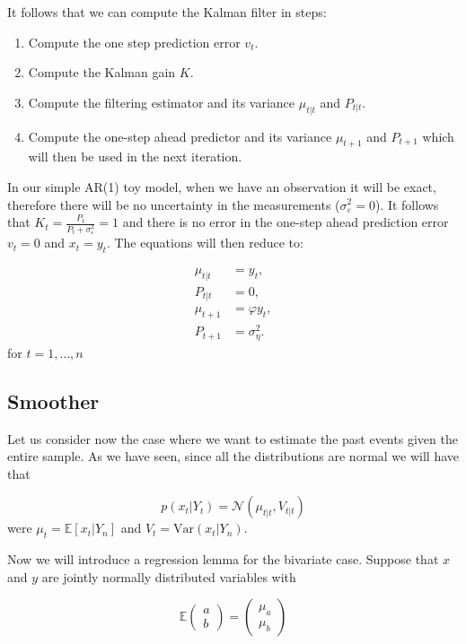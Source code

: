 \documentclass[11pt,a4paper]{article}
\newcommand{\E}{\mathbb{E}}
\newcommand{\var}{\mathrm{Var}}
\begin{document}
It follows that we can compute the Kalman filter in steps:

\begin{enumerate}
    \item Compute the one step prediction error $v_t$.
    \item Compute the Kalman gain $K$.
    \item Compute the filtering estimator and its variance $\mu_{t|t}$ and $P_{t|t}$.
    \item Compute the one-step ahead predictor and its variance $\mu_{t+1}$ and $P_{t+1}$ which will then be used in the next iteration.
\end{enumerate}

In our simple AR(1) toy model, when we have an observation it will be exact, therefore there will be no uncertainty in the measurements ($\sigma^2_\varepsilon = 0$). It follows that $K_t = \frac{P_t}{P_t + \sigma^2_\varepsilon} = 1$ and there is no error in the one-step ahead prediction error $v_t = 0$ and $x_t = y_t$. The equations will then reduce to:

\begin{align*}
    \mu_{t|t} &= y_t,\\
    P_{t|t} &= 0,\\
    \mu_{t+1} &= \varphi y_t,\\
    P_{t+1} &= \sigma^2_\eta.
\end{align*}
for $t = 1, \dots, n$

\subsection{Smoother}

Let us consider now the case where we want to estimate the past events given the entire sample.
As we have seen, since all the distributions are normal we will have that 

\[
    p(x_t | Y_t) = \mathcal{N}(\mu_{t|t}, V_{t|t})
\]
were $\mu_t = \E[x_t | Y_n]$ and $V_t = \var(x_t | Y_n)$.

Now we will introduce a regression lemma for the bivariate case.
Suppose that $x$ and $y$ are jointly normally distributed variables with

\[
\E\begin{pmatrix}a\\b\end{pmatrix} = \begin{pmatrix}\mu_a\\ \mu_b\end{pmatrix}
\]
\end{document}
